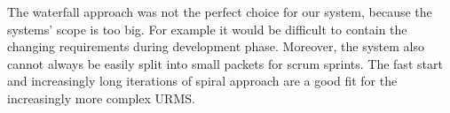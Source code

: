 \documentclass[conference,onecolumn]{IEEEtran}
\begin{document}


The waterfall approach was not the perfect choice for our system, because the systems' scope is too big. For example it would be difficult to contain the changing requirements during development phase.
Moreover, the system also cannot always be easily split into small packets for scrum sprints.
The fast start and increasingly long iterations of spiral approach are a good fit for the increasingly more complex URMS.
\end{document}
